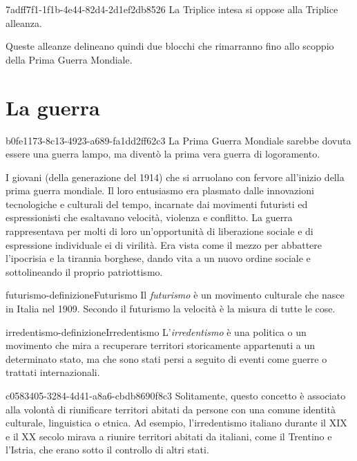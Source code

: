 \documentclass[preview]{standalone}
\begin{document}
\begin{snippet}{7adff7f1-1f1b-4e44-82d4-2d1ef2db8526}
    La Triplice intesa si oppose alla Triplice alleanza.

    Queste alleanze delineano quindi due blocchi che rimarranno fino allo scoppio della Prima
    Guerra Mondiale.
    
\end{snippet}

\section{La guerra}

\begin{snippet}{b0fe1173-8c13-4923-a689-fa1dd2ff62c3}
    La Prima Guerra Mondiale sarebbe dovuta essere una guerra lampo, ma diventò la prima
    vera guerra di logoramento.
    
    I giovani (della generazione del 1914) che si arruolano con fervore
    all'inizio della prima guerra mondiale.
    Il loro entusiasmo era plasmato dalle innovazioni tecnologiche e culturali del tempo,
    incarnate dai movimenti futuristi ed espressionisti che esaltavano velocità,
    violenza e conflitto.
    La guerra rappresentava per molti di loro un'opportunità di liberazione sociale e
    di espressione individuale ei di virilità.
    Era vista come il mezzo per abbattere l'ipocrisia e la tirannia borghese,
    dando vita a un nuovo ordine sociale e sottolineando il proprio patriottismo.
\end{snippet}

\begin{snippetdefinition}{futurismo-definizione}{Futurismo}
    Il \textit{futurismo} è un movimento culturale che nasce in Italia nel
    1909. Secondo il futurismo la velocità è la misura di tutte le cose.
\end{snippetdefinition}

\begin{snippetdefinition}{irredentismo-definizione}{Irredentismo}
    L'\textit{irredentismo} è una politica o un movimento che 
    mira a recuperare territori storicamente appartenuti a un determinato stato,
    ma che sono stati persi a seguito di eventi come guerre o trattati internazionali.
\end{snippetdefinition}

\begin{snippet}{c0583405-3284-4d41-a8a6-cbdb8690f8c3}
    Solitamente, questo concetto è associato alla volontà di riunificare territori
    abitati da persone con una comune identità culturale, linguistica o etnica.
    Ad esempio, l'irredentismo italiano durante il XIX e il XX secolo mirava a
    riunire territori abitati da italiani, come il Trentino e l'Istria, che erano
    sotto il controllo di altri stati.

\end{snippet}
\end{document}

